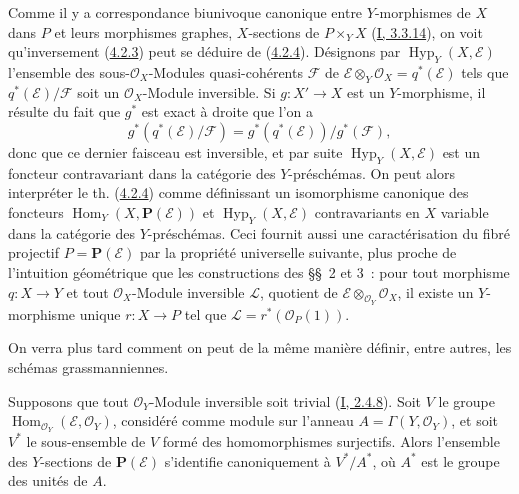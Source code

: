 \begin{remark}[4.2.5]
\label{II.4.2.5-fr}
Comme il y a correspondance biunivoque canonique entre $Y$-morphismes de $X$
dans $P$ et leurs morphismes graphes, $X$-sections de $P\times_YX$
(\hyperref[I.3.3.14-fr]{I, 3.3.14}), on voit qu'inversement
(\hyperref[II.4.2.3-fr]{4.2.3}) peut se déduire de
(\hyperref[II.4.2.4-fr]{4.2.4}). Désignons par
$\operatorname{Hyp}_Y(X,\mathcal{E})$ l'ensemble des
sous-$\mathcal{O}_X$-Modules quasi-cohérents $\mathcal{F}$ de
$\mathcal{E}\otimes_Y\mathcal{O}_X=q^*(\mathcal{E})$ tels que
$q^*(\mathcal{E})/\mathcal{F}$ soit un $\mathcal{O}_X$-Module inversible. Si
$g:X'\to X$ est un $Y$-morphisme, il résulte du fait que $g^*$ est exact à
droite que l'on a
\[
  g^*(q^*(\mathcal{E})/\mathcal{F})=
  g^*(q^*(\mathcal{E}))/g^*(\mathcal{F}),
\]
donc que ce dernier faisceau est inversible, et par suite
$\operatorname{Hyp}_Y(X,\mathcal{E})$ est un foncteur contravariant dans la
catégorie des $Y$-préschémas. On peut alors interpréter le th.
(\hyperref[II.4.2.4-fr]{4.2.4}) comme définissant un isomorphisme canonique
des foncteurs $\operatorname{Hom}_Y(X,\mathbf{P}(\mathcal{E}))$ et
$\operatorname{Hyp}_Y(X,\mathcal{E})$ contravariants en $X$ variable dans la
catégorie des $Y$-préschémas. Ceci fournit aussi une caractérisation du fibré
projectif $P=\mathbf{P}(\mathcal{E})$ par la propriété universelle suivante,
plus proche de l'intuition géométrique que les constructions des \S\S~2 et
3~: pour tout morphisme $q:X\to Y$ et tout $\mathcal{O}_X$-Module inversible
$\mathcal{L}$, quotient de $\mathcal{E}\otimes_{\mathcal{O}_Y}\mathcal{O}_X$,
il existe un $Y$-morphisme unique $r:X\to P$ tel que
$\mathcal{L}=r^*(\mathcal{O}_P(1))$.

On verra plus tard comment on peut de la même manière définir, entre autres,
les schémas \og grassmanniennes\fg{}.
\end{remark}

\begin{corollary}[4.2.6]
\label{II.4.2.6-fr}
Supposons que tout $\mathcal{O}_Y$-Module inversible soit trivial
(\hyperref[I.2.4.8-fr]{I, 2.4.8}). Soit $V$ le groupe
$\operatorname{Hom}_{\mathcal{O}_Y}(\mathcal{E},\mathcal{O}_Y)$, considéré
comme module sur l'anneau $A=\Gamma(Y,\mathcal{O}_Y)$, et soit $V^*$ le
sous-ensemble de $V$ formé des homomorphismes surjectifs. Alors l'ensemble
des $Y$-sections de $\mathbf{P}(\mathcal{E})$ s'identifie canoniquement à
$V^*/A^*$, où $A^*$ est le groupe des unités de $A$.
\end{corollary}

